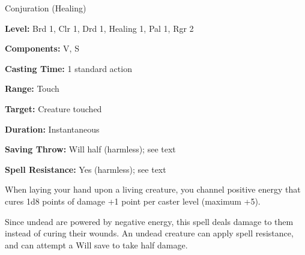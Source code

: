 
Conjuration (Healing)

\textbf{Level:} Brd 1, Clr 1, Drd 1, Healing 1, Pal 1, Rgr 2

\textbf{Components:} V, S

\textbf{Casting Time:} 1 standard action

\textbf{Range:} Touch

\textbf{Target:} Creature touched

\textbf{Duration:} Instantaneous

\textbf{Saving Throw:} Will half (harmless); see text

\textbf{Spell Resistance:} Yes (harmless); see text

When laying your hand upon a living creature, you channel positive energy that 
cures 1d8 points of damage +1 point per caster level (maximum +5).

Since undead are powered by negative energy, this spell deals damage to them instead 
of curing their wounds. An undead creature can apply spell resistance, and can 
attempt a Will save to take half damage.

